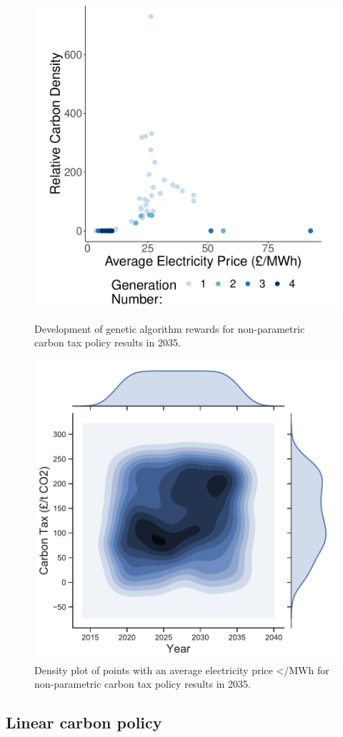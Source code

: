 \documentclass[sigconf]{acmart}
\begin{document}
\begin{figure}
\centering
\includegraphics[width=0.72\linewidth]{figures/results/free_points_ga_development}
\caption{Development of genetic algorithm rewards for non-parametric carbon tax policy results in 2035.}
\label{fig:free_points_ga_development}
%
\includegraphics[width=0.71\linewidth]{figures/results/best_heatmap_no_marginals}
\caption{Density plot of points with an average electricity price </MWh for non-parametric carbon tax policy results in 2035.}
\label{fig:heatmap_of_free_points}
\end{figure}



\subsection{Linear carbon policy}
\label{sssec:result_linear_carbon_strategy}
\end{document}
